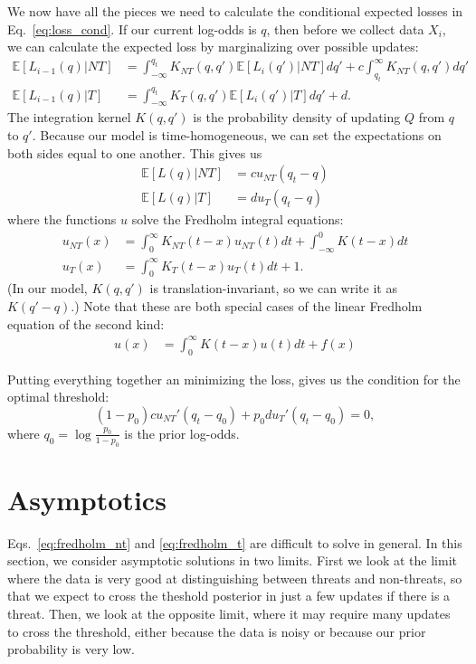 \documentclass[12pt, letterpaper]{article}
\begin{document}
We now have all the pieces we need to calculate the conditional expected losses in Eq.~\ref{eq:loss_cond}.
If our current log-odds is $q$, then before we collect data $X_i$, we can calculate the expected loss by marginalizing over possible updates:
\begin{align}
    \mathbb{E}[L_{i-1}(q) | NT] & = \int_{-\infty}^{q_t} K_{NT}(q, q') \mathbb{E}[L_{i}(q')| NT]  dq' + c \int_{q_t}^{\infty} K_{NT}(q, q') dq' \\
    \mathbb{E}[L_{i-1}(q) | T] & = \int_{-\infty}^{q_t} K_{T}(q, q') \mathbb{E}[L_{i}(q')| T]  dq' + d.
\end{align}
The integration kernel $K(q, q')$ is the probability density of updating $Q$ from $q$ to $q'$.
Because our model is time-homogeneous, we can set the expectations on both sides equal to one another.
This gives us 
\begin{align}
    \mathbb{E}[L(q) | NT] & = c u_{NT}(q_t - q) \\
    \mathbb{E}[L(q) | T] & = d u_{T}(q_t - q) 
\end{align}
where the functions $u$ solve the Fredholm integral equations:
\begin{align}
    u_{NT}(x) & = \int_{0}^{\infty} K_{NT}(t - x) u_{NT}(t) dt + \int_{-\infty}^{0} K(t - x) dt 
    \label{eq:fredholm_nt} \\
    u_{T}(x) & = \int_{0}^{\infty} K_{T}(t - x) u_{T}(t) dt + 1.
    \label{eq:fredholm_t}
\end{align}
(In our model, $K(q, q')$ is translation-invariant, so we can write it as $K(q' - q)$.)
Note that these are both special cases of the linear Fredholm equation of the second kind:
\begin{align}
    u(x) &= \int_0^{\infty} K(t - x) u(t) dt + f(x)
\end{align}

Putting everything together an minimizing the loss, gives us the condition for the optimal threshold:
\begin{equation}
    (1 - p_0) c u_{NT}'(q_t - q_0) + p_0 d u_{T}'(q_t - q_0) = 0,
    \label{eq:optimum}
\end{equation}
where $q_0 = \log \frac{p_0}{1-p_0}$ is the prior log-odds.

\section{Asymptotics}

Eqs.~\ref{eq:fredholm_nt} and \ref{eq:fredholm_t} are difficult to solve in general.
In this section, we consider asymptotic solutions in two limits.
First we look at the limit where the data is very good at distinguishing between threats and non-threats, so that we expect to cross the theshold posterior in just a few updates if there is a threat.
Then, we look at the opposite limit, where it may require many updates to cross the threshold, either because the data is noisy or because our prior probability is very low.
\end{document}
